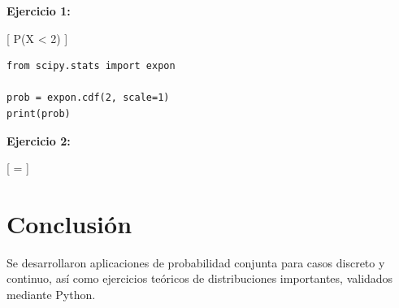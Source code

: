 \documentclass[12pt]{article}
\begin{document}
\textbf{Ejercicio 1:}

[
P(X < 2)
]

\begin{lstlisting}
from scipy.stats import expon

prob = expon.cdf(2, scale=1)
print(prob)
\end{lstlisting}

\textbf{Ejercicio 2:}

[
\mu = 
]

\section{Conclusión}

Se desarrollaron aplicaciones de probabilidad conjunta para casos discreto y continuo, así como ejercicios teóricos de distribuciones importantes, validados mediante Python.
\end{document}
